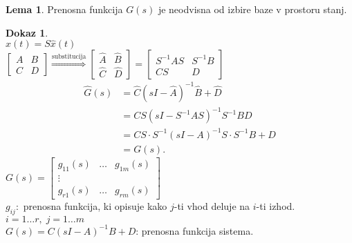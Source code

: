 \documentclass[a4paper, 12pt]{book}
\theoremstyle{definition}
\newtheorem{lemma}[counter]{Lema}
\newtheorem{pro}[counter]{Dokaz}
\theoremstyle{remark}
\begin{document}
\begin{lemma}
    Prenosna funkcija $G(s)$ je neodvisna od izbire baze v prostoru stanj.
\end{lemma} 
\begin{pro} \text{} \\
    $x(t) = S \hat{x}(t)$ \\
    $\begin{bmatrix} A & B \\ C & D \end{bmatrix} \stackrel{\text{substitucija}}{\Longrightarrow}
    \begin{bmatrix} \hat{A} & \hat{B} \\ \hat{C} & \hat{D} \end{bmatrix} =
    \begin{bmatrix} S^{-1} A S & S^{-1} B \\ CS & D \end{bmatrix}$
    \begin{align*}
        \hat{G}(s) &= \hat{C} (sI - \hat{A})^{-1} \hat{B} + \hat{D} \\
        &= C S (sI - S^{-1} A S)^{-1} S^{-1} B  D \\
        &= C S \cdot S^{-1} (sI - A)^{-1} S \cdot S^{-1} B + D \\
        &= G(s).
    \end{align*}
    $G(s) = \begin{bmatrix}
        g_{11}(s) & \dots & g_{1m}(s) \\
        \vdots & & \\
        g_{r1}(s) & \dots & g_{rm}(s)
    \end{bmatrix}$ \\
    $g_{ij}:$ prenosna funkcija, ki opisuje kako $j$-ti vhod deluje na $i$-ti izhod. \\
    $i = 1 \dots r, \; j = 1 \dots m$ \\
    $G(s) = C (sI - A)^{-1} B + D$: prenosna funkcija sistema.
\end{pro}
\end{document}
